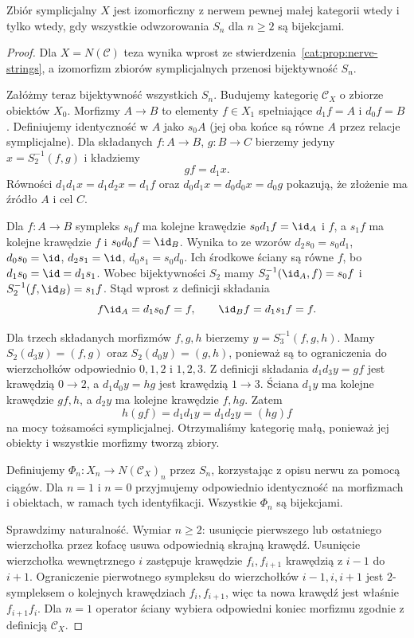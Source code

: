 \begin{twierdzenie}\label{cat:thm:nerve-segal}
Zbiór symplicjalny $X$ jest izomorficzny z nerwem pewnej małej kategorii wtedy i tylko wtedy, gdy wszystkie odwzorowania $S_n$ dla $n\geq2$ są bijekcjami.
\end{twierdzenie}
\begin{proof}
Dla $X=N(\mathcal C)$ teza wynika wprost ze stwierdzenia~\ref{cat:prop:nerve-strings}, a izomorfizm zbiorów symplicjalnych przenosi bijektywność $S_n$.

Załóżmy teraz bijektywność wszystkich $S_n$. Budujemy kategorię $\mathcal C_X$ o zbiorze obiektów $X_0$. Morfizmy $A\to B$ to elementy $f\in X_1$ spełniające $d_1f=A$ i $d_0f=B$. Definiujemy identyczność w $A$ jako $s_0A$ (jej oba końce są równe $A$ przez relacje symplicjalne). Dla składanych $f:A\to B$, $g:B\to C$ bierzemy jedyny $x=S_2^{-1}(f,g)$ i kładziemy
\[
 gf=d_1x.
\]
Równości $d_1d_1x=d_1d_2x=d_1f$ oraz $d_0d_1x=d_0d_0x=d_0g$ pokazują, że złożenie ma źródło $A$ i cel $C$.

Dla $f:A\to B$ sympleks $s_0f$ ma kolejne krawędzie $s_0d_1f=\id_A$ i $f$, a $s_1f$ ma kolejne krawędzie $f$ i $s_0d_0f=\id_B$. Wynika to ze wzorów $d_2s_0=s_0d_1$, $d_0s_0=\id$, $d_2s_1=\id$, $d_0s_1=s_0d_0$. Ich środkowe ściany są równe $f$, bo $d_1s_0=\id=d_1s_1$. Wobec bijektywności $S_2$ mamy $S_2^{-1}(\id_A,f)=s_0f$ i $S_2^{-1}(f,\id_B)=s_1f$. Stąd wprost z definicji składania
\[
 f\id_A=d_1s_0f=f,\qquad
 \id_Bf=d_1s_1f=f.
\]

Dla trzech składanych morfizmów $f,g,h$ bierzemy $y=S_3^{-1}(f,g,h)$. Mamy $S_2(d_3y)=(f,g)$ oraz $S_2(d_0y)=(g,h)$, ponieważ są to ograniczenia do wierzchołków odpowiednio $0,1,2$ i $1,2,3$. Z definicji składania $d_1d_3y=gf$ jest krawędzią $0\to2$, a $d_1d_0y=hg$ jest krawędzią $1\to3$. Ściana $d_1y$ ma kolejne krawędzie $gf,h$, a $d_2y$ ma kolejne krawędzie $f,hg$. Zatem
\[
 h(gf)=d_1d_1y=d_1d_2y=(hg)f
\]
na mocy tożsamości symplicjalnej. Otrzymaliśmy kategorię małą, ponieważ jej obiekty i wszystkie morfizmy tworzą zbiory.

Definiujemy $\Phi_n:X_n\to N(\mathcal C_X)_n$ przez $S_n$, korzystając z opisu nerwu za pomocą ciągów. Dla $n=1$ i $n=0$ przyjmujemy odpowiednio identyczność na morfizmach i obiektach, w ramach tych identyfikacji. Wszystkie $\Phi_n$ są bijekcjami.

Sprawdzimy naturalność. Wymiar $n\geq2$: usunięcie pierwszego lub ostatniego wierzchołka przez kofacę usuwa odpowiednią skrajną krawędź. Usunięcie wierzchołka wewnętrznego $i$ zastępuje krawędzie $f_i,f_{i+1}$ krawędzią z $i-1$ do $i+1$. Ograniczenie pierwotnego sympleksu do wierzchołków $i-1,i,i+1$ jest $2$-sympleksem o kolejnych krawędziach $f_i,f_{i+1}$, więc ta nowa krawędź jest właśnie $f_{i+1}f_i$. Dla $n=1$ operator ściany wybiera odpowiedni koniec morfizmu zgodnie z definicją $\mathcal C_X$.


\end{proof}
